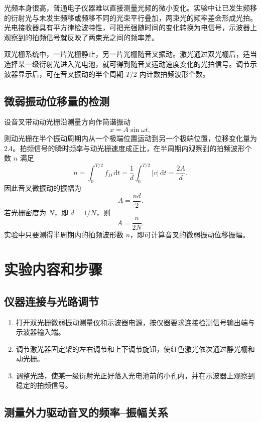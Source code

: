 \documentclass{../template/myrpt}
\begin{document}
光频本身很高，普通电子仪器难以直接测量光频的微小变化。实验中让已发生频移的衍射光与未发生频移或频移不同的光束平行叠加，两束光的频率差会形成光拍。光电接收器具有平方律检波特性，可把光强随时间的变化转换为电信号，示波器上观察到的拍频信号就反映了两束光之间的频率差。

双光栅系统中，一片光栅静止，另一片光栅随音叉振动。激光通过双光栅后，适当选择某一级衍射光进入光电池，就可得到随音叉运动速度变化的光拍信号。调节示波器显示后，可在音叉振动的半个周期 $T/2$ 内计数拍频波形个数。

\subsection{微弱振动位移量的检测}

设音叉带动动光栅沿测量方向作简谐振动
\[
  x = A\sin \omega t,
\]
则动光栅在半个振动周期内从一个极端位置运动到另一个极端位置，位移变化量为 $2A$。拍频信号的瞬时频率与动光栅速度成正比，在半周期内观察到的拍频波形个数 $n$ 满足
\[
  n = \int_0^{T/2} f_D\,\mathrm{d}t
    = \frac{1}{d}\int_0^{T/2} |v|\,\mathrm{d}t
    = \frac{2A}{d}.
\]
因此音叉微振动的振幅为
\[
  A = \frac{nd}{2}.
\]
若光栅密度为 $N$，即 $d=1/N$，则
\[
  A = \frac{n}{2N}.
\]
实验中只要测得半周期内的拍频波形数 $n$，即可计算音叉的微弱振动位移振幅。

\section{实验内容和步骤}

\subsection{仪器连接与光路调节}

\begin{enumerate}[label=\arabic*)]
  \item 打开双光栅微弱振动测量仪和示波器电源，按仪器要求连接检测信号输出端与示波器输入端。
  \item 调节激光器固定架的左右调节和上下调节旋钮，使红色激光依次通过静光栅和动光栅。
  \item 调整光路，使某一级衍射光正好落入光电池前的小孔内，并在示波器上观察到稳定的拍频信号。
\end{enumerate}

\subsection{测量外力驱动音叉的频率--振幅关系}
\end{document}
